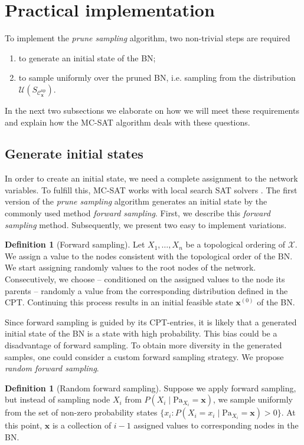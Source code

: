 \documentclass[a4paper, twoside, 11pt]{report}
\newcommand{\bfx}{{\mathbf{x}}}
\newcommand{\C}{{\mathcal C}}
\newcommand{\U}{{\mathcal{U}}}
\theoremstyle{plain}
\theoremstyle{definition}
\newtheorem{definition}[thm]{Definition}
\theoremstyle{remark}
\newcommand{\X}{{\mathcal{X}}}
\newcommand{\ps}{\textit{prune sampling }}
\begin{document}
\section{Practical implementation}
To implement the \ps algorithm, two non-trivial steps are required
\begin{enumerate}
\item to generate an initial state of the BN;
\item to sample uniformly over the pruned BN, i.e. sampling from the distribution $\U(S_{\C_\bfx^{\text{np}}})$.
\end{enumerate}
In the next two subsections we elaborate on how we will meet these requirements and explain how the MC-SAT algorithm deals with these questions.

\subsection{Generate initial states}
In order to create an initial state, we need a complete assignment to the network variables. To fulfill this, MC-SAT works with local search SAT solvers \cite{poon2006sound}. The first version of the \ps algorithm generates an initial state by the commonly used method \textit{forward sampling}. First, we describe this \textit{forward sampling} method. Subsequently, we present two easy to implement variations.
\begin{definition}[Forward sampling]
Let $X_1, \ldots , X_n$ be a topological ordering of $\X$. We assign a value to the nodes consistent with the topological order of the BN. We start assigning randomly values to the root nodes of the network. Consecutively, we choose -- conditioned on the assigned values to the node its parents -- randomly a value from the corresponding distribution defined in the CPT. Continuing this process results in an initial feasible state $\bfx^{(0)}$ of the BN.
\end{definition}
Since forward sampling is guided by its CPT-entries, it is likely that a generated initial state of the BN is a state with high probability. This bias could be a disadvantage of forward sampling. To obtain more diversity in the generated samples, one could consider a custom forward sampling strategy. We propose \textit{random forward sampling}.
\begin{definition}[Random forward sampling]\label{def:rfs}
Suppose we apply forward sampling, but instead of sampling node $X_i$ from $P(X_i \mid \text{Pa}_{X_i} = \mathbf{x})$, we sample uniformly from the set of non-zero probability states $\{x_i : P(X_i = x_i \mid \text{Pa}_{X_i}=\mathbf{x}) > 0\}$. At this point, $\bfx$ is a collection of $i-1$ assigned values to corresponding nodes in the BN. 
\end{definition}
\end{document}

